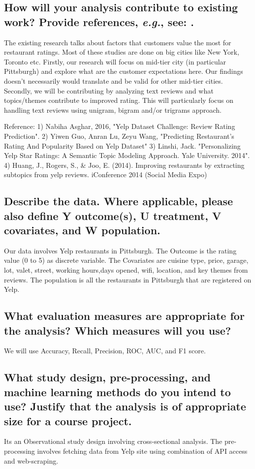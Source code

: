 \documentclass[twoside,11pt]{article}
\begin{document}
\subsection{How will your analysis contribute to existing work? Provide references, \emph{e.g.}, see: \cite{cite1}.}
The existing research talks about factors that customers value the most for restaurant ratings. Most of these studies are done on big cities like New York, Toronto etc. Firstly, our research will focus on mid-tier city (in particular Pittsburgh) and explore what are the customer expectations here. Our findings doesn't necessarily would translate and be valid for other mid-tier cities. Secondly, we will be contributing by analyzing text reviews and what topics/themes contribute to improved rating. This will particularly focus on handling text reviews using unigram, bigram and/or trigrams approach.   

Reference: 1) Nabiha Asghar, 2016, "Yelp Dataset Challenge: Review Rating Prediction". 2) Yiwen Guo, Anran Lu, Zeyu Wang, "Predicting Restaurant's Rating And Popularity Based on Yelp Dataset" 3) Linshi, Jack. "Personalizing Yelp Star Ratings: A Semantic Topic Modeling Approach. Yale University. 2014". 4) Huang, J., Rogers, S., & Joo, E. (2014). Improving restaurants by extracting subtopics from yelp reviews. iConference 2014 (Social Media Expo)

\subsection{Describe the data. Where applicable, please also define Y outcome(s), U treatment, V covariates, and W population.}
Our data involves Yelp restaurants in Pittsburgh. The Outcome is the rating value (0 to 5) as discrete variable. The Covariates are cuisine type, price, garage, lot, valet, street, working hours,days opened, wifi, location, and key themes from reviews. The population is all the restaurants in Pittsburgh that are registered on Yelp.    

\subsection{What evaluation measures are appropriate for the analysis? Which measures will you use?}
We will use Accuracy, Recall, Precision, ROC, AUC, and F1 score.  

\subsection{What study design, pre-processing, and machine learning methods do you intend to use? Justify that the analysis is of appropriate size for a course project.}
Its an Observational study design involving cross-sectional analysis. The pre-processing involves fetching data from Yelp site using combination of API access and web-scraping.
\end{document}

